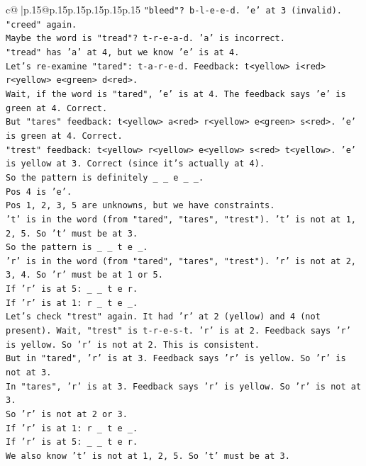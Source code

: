 \documentclass{article}
\begin{document}
{\begin{supertabular}{c@{$\;$}|p{.15\linewidth}@{}p{.15\linewidth}p{.15\linewidth}p{.15\linewidth}p{.15\linewidth}p{.15\linewidth}}
{{{\texttt{"bleed"? b{-}l{-}e{-}e{-}d. 'e' at 3 (invalid).} \\
\texttt{"creed" again.} \\
\texttt{Maybe the word is "tread"? t{-}r{-}e{-}a{-}d. 'a' is incorrect.} \\
\texttt{"tread" has 'a' at 4, but we know 'e' is at 4.} \\
\texttt{Let's re{-}examine "tared": t{-}a{-}r{-}e{-}d. Feedback: t<yellow> i<red> r<yellow> e<green> d<red>.} \\
\texttt{Wait, if the word is "tared", 'e' is at 4. The feedback says 'e' is green at 4. Correct.} \\
\texttt{But "tares" feedback: t<yellow> a<red> r<yellow> e<green> s<red>. 'e' is green at 4. Correct.} \\
\texttt{"trest" feedback: t<yellow> r<yellow> e<yellow> s<red> t<yellow>. 'e' is yellow at 3. Correct (since it's actually at 4).} \\
\texttt{So the pattern is definitely \_ \_ e \_ \_.} \\
\texttt{Pos 4 is 'e'.} \\
\texttt{Pos 1, 2, 3, 5 are unknowns, but we have constraints.} \\
\texttt{'t' is in the word (from "tared", "tares", "trest"). 't' is not at 1, 2, 5. So 't' must be at 3.} \\
\texttt{So the pattern is \_ \_ t e \_.} \\
\texttt{'r' is in the word (from "tared", "tares", "trest"). 'r' is not at 2, 3, 4. So 'r' must be at 1 or 5.} \\
\texttt{If 'r' is at 5: \_ \_ t e r.} \\
\texttt{If 'r' is at 1: r \_ t e \_.} \\
\texttt{Let's check "trest" again. It had 'r' at 2 (yellow) and 4 (not present). Wait, "trest" is t{-}r{-}e{-}s{-}t. 'r' is at 2. Feedback says 'r' is yellow. So 'r' is not at 2. This is consistent.} \\
\texttt{But in "tared", 'r' is at 3. Feedback says 'r' is yellow. So 'r' is not at 3.} \\
\texttt{In "tares", 'r' is at 3. Feedback says 'r' is yellow. So 'r' is not at 3.} \\
\texttt{So 'r' is not at 2 or 3.} \\
\texttt{If 'r' is at 1: r \_ t e \_.} \\
\texttt{If 'r' is at 5: \_ \_ t e r.} \\
\texttt{We also know 't' is not at 1, 2, 5. So 't' must be at 3.} \\
}}}
\end{supertabular}}
\end{document}
